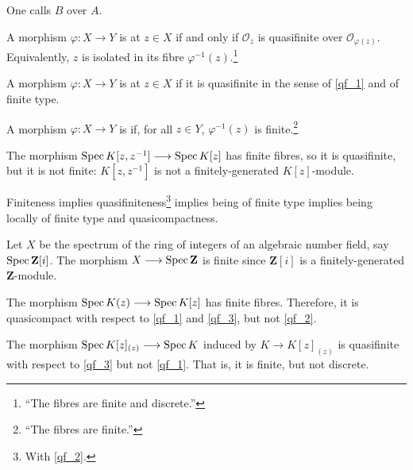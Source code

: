 \documentclass [11 pt, oneside] {article}
\begin{document}
One calls $B$  over $A$.
\begin{definition}[SGA 1 I 2]\label{qf_1}\text{}
A morphism $\varphi:X\longrightarrow Y$ is  at $z\in X$ if and only if $\mathscr{O}_z$ is quasifinite over $\mathscr{O}_{\varphi (z)}$. Equivalently, $z$ is isolated in its fibre $\varphi^{-1}(z)$.\footnote{``The fibres are finite and discrete.''}
\end{definition}
\begin{definition}[EGA II 6.2]\label{qf_2}\text{} 
	A morphism $\varphi: X \longrightarrow Y$ is  at $z\in X$ if it is quasifinite in the sense of \cref{qf_1} and of finite type. 
\end{definition}
\begin{definition}[Hartshorne p. 91]\label{qf_3}\text{}
A morphism $\varphi : X\longrightarrow Y$ is  if, for all $z\in Y$, $\varphi^{-1}(z)$ is finite.\footnote{``The fibres are finite.''}
\end{definition}
\begin{remark}\label{qfnf_1}
	The morphism $\operatorname{Spec} K[z,z^{-1}]\longrightarrow \operatorname{Spec} K[z]$ has finite fibres, so it is quasifinite, but it is not finite: $K[z,z^{-1}]$ is not a finitely-generated $K[z]$-module.
\end{remark}
\begin{remark}
	Finiteness implies quasifiniteness\footnote{With \cref{qf_2}.} implies being of finite type implies being locally of finite type and quasicompactness.
\end{remark}

\begin{example}[ ]\label{}\text{}
Let $X$ be the spectrum of the ring of integers of an algebraic number field, say $\operatorname{Spec} \mathbf{Z}[i]$. The morphism $X\longrightarrow \operatorname{Spec} \mathbf{Z}$ is finite since $\mathbf{Z}[i]$ is a finitely-generated $\mathbf{Z}$-module. 
\end{example}

\begin{example}[ ]\label{}\text{}
The morphism $\operatorname{Spec} K(z) \longrightarrow \operatorname{Spec} K[z]$ has finite fibres. Therefore, it is quasicompact with respect to \cref{qf_1} and \cref{qf_3}, but not \cref{qf_2}.
\end{example}

\begin{example}[ ]\label{}\text{}
The morphism $\operatorname{Spec} K[z]_{(z)} \longrightarrow \operatorname{Spec} K$ induced by $K\longrightarrow K[z]_{(z) }$ is quasifinite with respect to \cref{qf_3} but not \cref{qf_1}. That is, it is finite, but not discrete.
\end{example}
\end{document}
